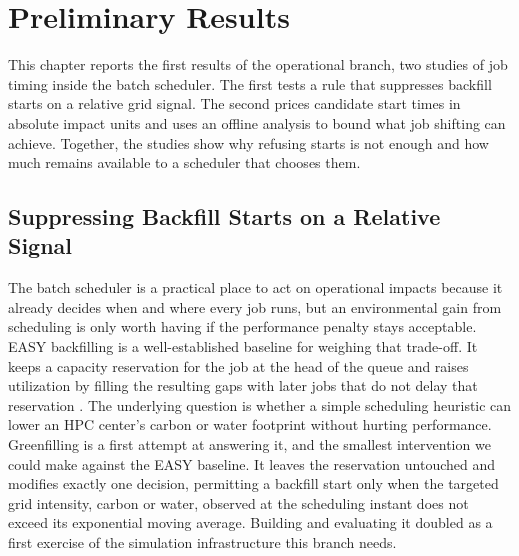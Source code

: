 \chapter{Preliminary Results}
\label{ch:preliminary}

This chapter reports the first results of the operational branch, two studies of job timing inside the batch scheduler. The first tests a rule that suppresses backfill starts on a relative grid signal. The second prices candidate start times in absolute impact units and uses an offline analysis to bound what job shifting can achieve. Together, the studies show why refusing starts is not enough and how much remains available to a scheduler that chooses them.

\section{Suppressing Backfill Starts on a Relative Signal}

The batch scheduler is a practical place to act on operational impacts because it already decides when and where every job runs, but an environmental gain from scheduling is only worth having if the performance penalty stays acceptable. EASY backfilling is a well-established baseline for weighing that trade-off. It keeps a capacity reservation for the job at the head of the queue and raises utilization by filling the resulting gaps with later jobs that do not delay that reservation \parencite{skovira1996EASY, mualem2001Utilization}. The underlying question is whether a simple scheduling heuristic can lower an HPC center's carbon or water footprint without hurting performance. Greenfilling is a first attempt at answering it, and the smallest intervention we could make against the EASY baseline. It leaves the reservation untouched and modifies exactly one decision, permitting a backfill start only when the targeted grid intensity, carbon or water, observed at the scheduling instant does not exceed its exponential moving average. Building and evaluating it doubled as a first exercise of the simulation infrastructure this branch needs.

